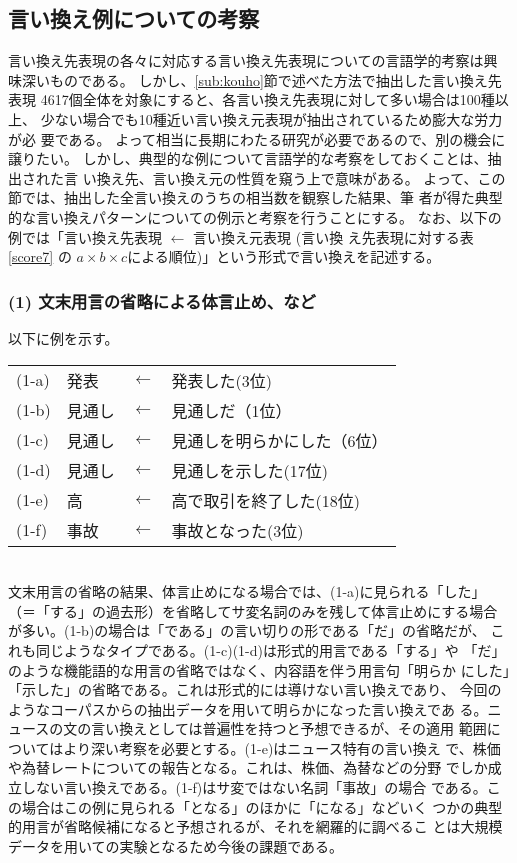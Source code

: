 \documentclass[jnlpbbl]{jnlp_j}
\begin{document}
\subsection{言い換え例についての考察} \label{subsec:rei} 

言い換え先表現の各々に対応する言い換え先表現についての言語学的考察は興
味深いものである。
しかし、\ref{sub:kouho}節で述べた方法で抽出した言い換え先表現
4617個全体を対象にすると、各言い換え先表現に対して多い場合は100種以上、
少ない場合でも10種近い言い換え元表現が抽出されているため膨大な労力が必
要である。
よって相当に長期にわたる研究が必要であるので、別の機会に譲りたい。
しかし、典型的な例について言語学的な考察をしておくことは、抽出された言
い換え先、言い換え元の性質を窺う上で意味がある。
よって、この節では、抽出した全言い換えのうちの相当数を観察した結果、筆
者が得た典型的な言い換えパターンについての例示と考察を行うことにする。
なお、以下の例では「言い換え先表現 $\leftarrow$ 言い換え元表現 (言い換
え先表現に対する表\ref{score7} の
$a \times b \times c$による順位)」という形式で言い換えを記述する。

\subsubsection*{(1) 文末用言の省略による体言止め、など}

以下に例を示す。\\

\begin{tabular}{llcl}
(1-a) & 発表 & $\leftarrow$ & 発表した(3位) \\
(1-b) & 見通し & $\leftarrow$ & 見通しだ（1位）\\ 
(1-c) & 見通し & $\leftarrow$ & 見通しを明らかにした（6位） \\
(1-d) & 見通し & $\leftarrow$ & 見通しを示した(17位) \\
(1-e) & 高 & $\leftarrow$ & 高で取引を終了した(18位) \\
(1-f) & 事故 & $\leftarrow$ & 事故となった(3位) \\ 
\end{tabular}
\\

文末用言の省略の結果、体言止めになる場合では、(1-a)に見られる「した」
（＝「する」の過去形）を省略してサ変名詞のみを残して体言止めにする場合
が多い。(1-b)の場合は「である」の言い切りの形である「だ」の省略だが、
これも同じようなタイプである。(1-c)(1-d)は形式的用言である「する」や
「だ」のような機能語的な用言の省略ではなく、内容語を伴う用言句「明らか
にした」「示した」の省略である。これは形式的には導けない言い換えであり、
今回のようなコーパスからの抽出データを用いて明らかになった言い換えであ
る。ニュースの文の言い換えとしては普遍性を持つと予想できるが、その適用
範囲についてはより深い考察を必要とする。(1-e)はニュース特有の言い換え
で、株価や為替レートについての報告となる。これは、株価、為替などの分野
でしか成立しない言い換えである。(1-f)はサ変ではない名詞「事故」の場合
である。この場合はこの例に見られる「となる」のほかに「になる」などいく
つかの典型的用言が省略候補になると予想されるが、それを網羅的に調べるこ
とは大規模データを用いての実験となるため今後の課題である。
\end{document}
